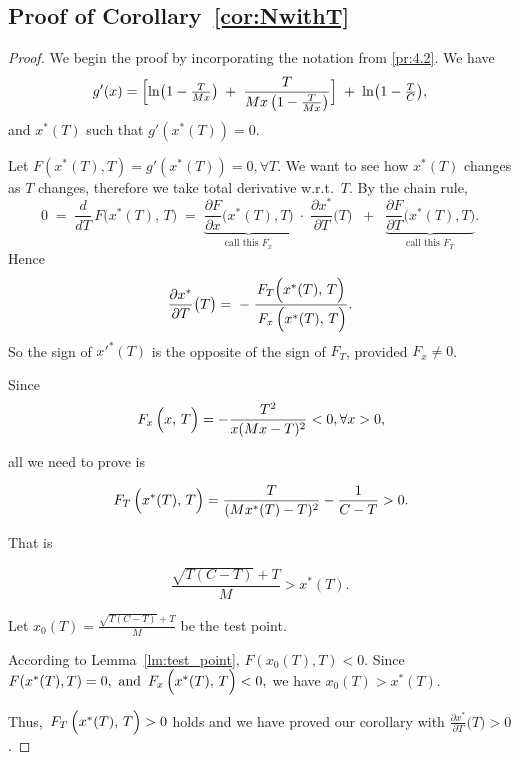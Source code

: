 \subsection{Proof of Corollary~\ref{cor:NwithT}}
\NwithT*

\begin{proof}
    We begin the proof by incorporating the notation from \ref{pr:4.2}.
    We have \[
g'(x) 
= \Bigl[\ln\bigl(1 - \tfrac{T}{Mx}\bigr) \;+\; \frac{T}{Mx\,\bigl(1 - \tfrac{T}{Mx}\bigr)}\Bigr]
\;+\;
\ln\bigl(1 - \tfrac{T}{C}\bigr),
\] and $x^*(T)$ such that $g'(x^*(T))=0$.

Let $F(x^*(T),T) = g'(x^*(T)) = 0 ,\forall T. $
We want to see how \(x^*(T)\) changes as \(T\) changes, therefore we take total derivative w.r.t.\ \(T\).  By the chain rule,
\[
0 
\;=\; 
\frac{d}{dT}\,F\bigl(x^*(T),\,T\bigr)
\;=\;
\underbrace{\frac{\partial F}{\partial x}\bigl(x^*(T),T\bigr)}_{\text{call this }F_x}\;\cdot\;\frac{\partial x^*}{\partial T}\bigl(T\bigl)
\;\;+\;\;
\underbrace{\frac{\partial F}{\partial T}\bigl(x^*(T),T\bigr)}_{\text{call this }F_T}.
\] 
Hence
\[
\frac{\partial x^*}{\partial T}\bigl(T\bigl)
\;=\;
-\;\frac{F_T\Bigl(x^*(T),\,T\Bigr)}{\,F_x\,\Bigl(x^*(T),\,T\Bigr)}.
\]
So the sign of \(x'^*(T)\) is the opposite of the sign of \(F_T\), provided \(F_x\neq 0\).  

Since
\begin{equation}
    \,F_x\,\Bigl(x,\,T\Bigr) = -\frac{T^2}{x(Mx-T)^2} < 0, \forall x > 0,
\end{equation}

all we need to prove is 

\begin{equation}
    \,F_T\,\Bigl(x^*(T),\,T\Bigr) = \frac{T}{(Mx^*(T)-T)^2}-\frac{1}{C-T}>0.
\end{equation}

That is 

\begin{equation}
    \frac{\sqrt{T(C-T)}+T}{M}>x^*(T).
\end{equation}

Let $x_0(T) = \frac{\sqrt{T(C-T)}+T}{M}$ be the test point.

According to Lemma~\ref{lm:test_point}, $F(x_0(T),T)<0$. Since $F(x^*(T),T) = 0, \text{ and } \,F_x\,\Bigl(x^*(T),\,T\Bigr)<0, $ we have $x_0(T)>x^*(T)$.

Thus, $\,F_T\,\Bigl(x^*(T),\,T\Bigr)>0$ holds and we have proved our corollary with $\frac{\partial x^*}{\partial T}\bigl(T\bigl) > 0$.

\end{proof}

